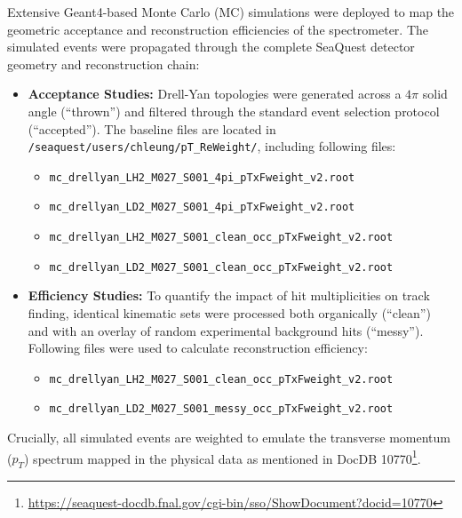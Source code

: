 \documentclass[11pt]{article}
\begin{document}
Extensive Geant4-based Monte Carlo (MC) simulations were deployed to map the geometric acceptance and reconstruction efficiencies of the spectrometer. The simulated events were propagated through the complete SeaQuest detector geometry and reconstruction chain:
\begin{itemize}
    \item \textbf{Acceptance Studies:} Drell-Yan topologies were generated across a $4\pi$ solid angle (``thrown'') and filtered through the standard event selection protocol (``accepted''). The baseline files are located in \texttt{/seaquest/users/chleung/pT\_ReWeight/}, including following files:
    \begin{itemize}
        \item \texttt{mc\_drellyan\_LH2\_M027\_S001\_4pi\_pTxFweight\_v2.root}
        \item \texttt{mc\_drellyan\_LD2\_M027\_S001\_4pi\_pTxFweight\_v2.root}
        \item \texttt{mc\_drellyan\_LH2\_M027\_S001\_clean\_occ\_pTxFweight\_v2.root}
        \item \texttt{mc\_drellyan\_LD2\_M027\_S001\_clean\_occ\_pTxFweight\_v2.root}
    \end{itemize}

    \item \textbf{Efficiency Studies:} To quantify the impact of hit multiplicities on track finding, identical kinematic sets were processed both organically (``clean'') and with an overlay of random experimental background hits (``messy''). Following files were used to calculate reconstruction efficiency:
    \begin{itemize}
        \item \texttt{mc\_drellyan\_LH2\_M027\_S001\_clean\_occ\_pTxFweight\_v2.root}
        \item \texttt{mc\_drellyan\_LD2\_M027\_S001\_messy\_occ\_pTxFweight\_v2.root} 
\end{itemize}
\end{itemize}
Crucially, all simulated events are weighted to emulate the transverse momentum ($p_T$) spectrum mapped in the physical data as mentioned in DocDB 10770\footnote{\url{https://seaquest-docdb.fnal.gov/cgi-bin/sso/ShowDocument?docid=10770}}.
\end{document}
